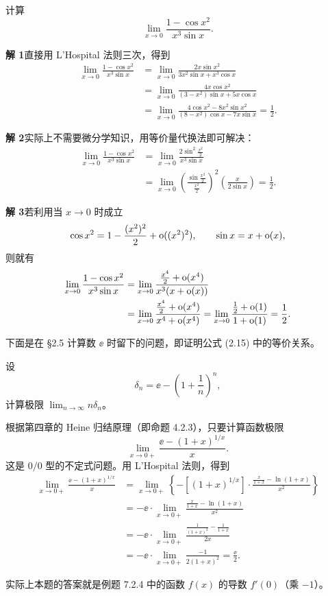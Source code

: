 \begin{xexample}[8.1.3]
计算
\[
  \lim_{x\to0}\frac{1-\cos x^2}{x^3\sin x}.
\]
\end{xexample}
\begin{xsolution}
\textbf{解 1}\quad 直接用 L'Hospital 法则三次，得到
\begin{align*}
  \lim_{x\to0}\frac{1-\cos x^2}{x^3\sin x}
  &=\lim_{x\to0}\frac{2x\sin x^2}{3x^2\sin x+x^3\cos x}\\
  &=\lim_{x\to0}\frac{4x\cos x^2}{(3-x^2)\sin x+5x\cos x}\\
  &=\lim_{x\to0}\frac{4\cos x^2-8x^2\sin x^2}{(8-x^2)\cos x-7x\sin x}
  =\frac12.
\end{align*}

\textbf{解 2}\quad 实际上不需要微分学知识，用等价量代换法即可解决：
\begin{align*}
  \lim_{x\to0}\frac{1-\cos x^2}{x^3\sin x}
  &=\lim_{x\to0}\frac{2\sin^2\frac{x^2}{2}}{x^3\sin x}\\
  &=\lim_{x\to0}\left(\frac{\sin\frac{x^2}{2}}{\frac{x^2}{2}}\right)^2
      \left(\frac{x}{2\sin x}\right)
  =\frac12.
\end{align*}

\textbf{解 3}\quad 若利用当 $x\to0$ 时成立
\[
  \cos x^2=1-\frac{(x^2)^2}{2}+\mathrm{o}((x^2)^2),
  \qquad
  \sin x=x+\mathrm{o}(x),
\]
则就有
\begin{align*}
  \lim_{x\to0}\frac{1-\cos x^2}{x^3\sin x}
  &=\lim_{x\to0}\frac{\frac{x^4}{2}+\mathrm{o}(x^4)}{x^3(x+\mathrm{o}(x))}\\
  &=\lim_{x\to0}\frac{\frac{x^4}{2}+\mathrm{o}(x^4)}{x^4+\mathrm{o}(x^4)}
  =\lim_{x\to0}\frac{\frac12+\mathrm{o}(1)}{1+\mathrm{o}(1)}
  =\frac12.
\end{align*}
\end{xsolution}

下面是在 §2.5 计算数 $\ee$ 时留下的问题，即证明公式 (2.15) 中的等价关系。

\begin{xexample}[8.1.4]
设
\[
  \delta_n=\ee-\left(1+\frac1n\right)^n,
\]
计算极限 $\displaystyle\lim_{n\to\infty}n\delta_n$。
\end{xexample}
\begin{xsolution}
根据第四章的 Heine 归结原理（即命题 4.2.3），只要计算函数极限
\[
  \lim_{x\to0+}\frac{\ee-(1+x)^{1/x}}{x}.
\]
这是 $0/0$ 型的不定式问题。用 L'Hospital 法则，得到
\begin{align*}
  \lim_{x\to0+}\frac{\ee-(1+x)^{1/x}}{x}
  &=\lim_{x\to0+}\left\{-[(1+x)^{1/x}]\cdot
    \frac{\frac{x}{1+x}-\ln(1+x)}{x^2}\right\}\\
  &=-\ee\cdot\lim_{x\to0+}\frac{\frac{x}{1+x}-\ln(1+x)}{x^2}\\
  &=-\ee\cdot\lim_{x\to0+}
    \frac{\frac1{(1+x)^2}-\frac1{1+x}}{2x}\\
  &=-\ee\cdot\lim_{x\to0+}\frac{-1}{2(1+x)^2}
  =\frac{\ee}{2}.
\end{align*}

\begin{xremark}
实际上本题的答案就是例题 7.2.4 中的函数 $f(x)$ 的导数 $f'(0)$（乘 $-1$）。
\end{xremark}
\end{xsolution}

